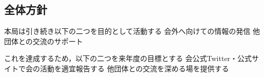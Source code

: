 \subsection*{全体方針}


本局は引き続き以下の二つを目的として活動する
 会外へ向けての情報の発信
 他団体との交流のサポート


これを達成するため，以下の二つを来年度の目標とする
 会公式Twitter・公式サイトで会の活動を適宜報告する
 他団体との交流を深める場を提供する



